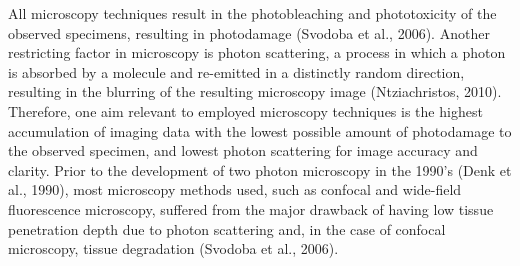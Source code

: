 \documentclass[11pt]{article}
\begin{document}
All microscopy techniques result in the photobleaching and phototoxicity of the observed specimens, resulting in photodamage (Svodoba et al., 2006). Another restricting factor in microscopy is photon scattering, a process in which a photon is absorbed by a molecule and re-emitted in a distinctly random direction, resulting in the blurring of the resulting microscopy image (Ntziachristos, 2010). Therefore, one aim relevant to employed microscopy techniques is the highest accumulation of imaging data with the lowest possible amount of photodamage to the observed specimen, and lowest photon scattering for image accuracy and clarity. Prior to the development of two photon microscopy in the 1990's (Denk et al., 1990), most microscopy methods used, such as confocal and wide-field fluorescence microscopy, suffered from the major drawback of having low tissue penetration depth due to photon scattering and, in the case of confocal microscopy, tissue degradation (Svodoba et al., 2006).\par
\end{document}
